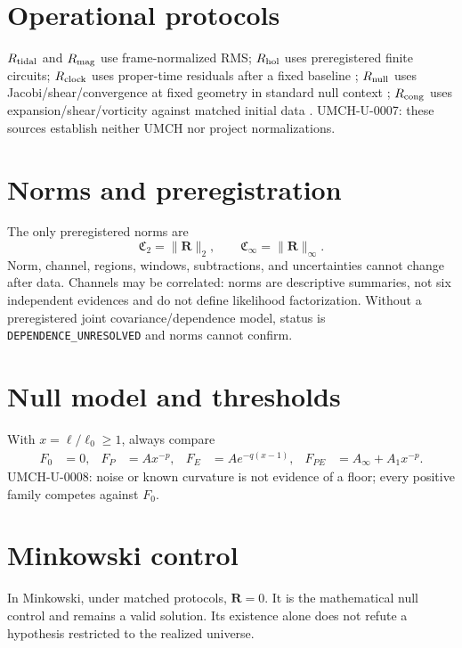 \documentclass[11pt,a4paper]{article}
\begin{document}
\section{Operational protocols}\label{sec:u-protocols}
$R_{\rm tidal}$ and $R_{\rm mag}$ use frame-normalized RMS; $R_{\rm hol}$ uses preregistered finite circuits; $R_{\rm clock}$ uses proper-time residuals after a fixed baseline \cite{PetitWolf2005}; $R_{\rm null}$ uses Jacobi/shear/convergence at fixed geometry in standard null context \cite{Sachs1961}; $R_{\rm cong}$ uses expansion/shear/vorticity against matched initial data \cite{Raychaudhuri1955}. UMCH-U-0007: these sources establish neither UMCH nor project normalizations.

\section{Norms and preregistration}\label{sec:u-norms}
The only preregistered norms are
\begin{equation}\label{eq:u-norms}\mathfrak C_2=\|\mathbf R\|_2,\qquad \mathfrak C_\infty=\|\mathbf R\|_\infty.\end{equation}
Norm, channel, regions, windows, subtractions, and uncertainties cannot change after data. Channels may be correlated: norms are descriptive summaries, not six independent evidences and do not define likelihood factorization. Without a preregistered joint covariance/dependence model, status is \verb|DEPENDENCE_UNRESOLVED| and norms cannot confirm.

\section{Null model and thresholds}\label{sec:u-thresholds}
With $x=\ell/\ell_0\geq1$, always compare
\begin{align}\label{eq:u-families}
F_0&=0,&F_P&=Ax^{-p},&F_E&=Ae^{-q(x-1)},&F_{PE}&=A_\infty+A_1x^{-p}.
\end{align}
UMCH-U-0008: noise or known curvature is not evidence of a floor; every positive family competes against $F_0$.

\section{Minkowski control}\label{sec:u-minkowski}
In Minkowski, under matched protocols, $\mathbf R=0$. It is the mathematical null control and remains a valid solution. Its existence alone does not refute a hypothesis restricted to the realized universe.
\end{document}
